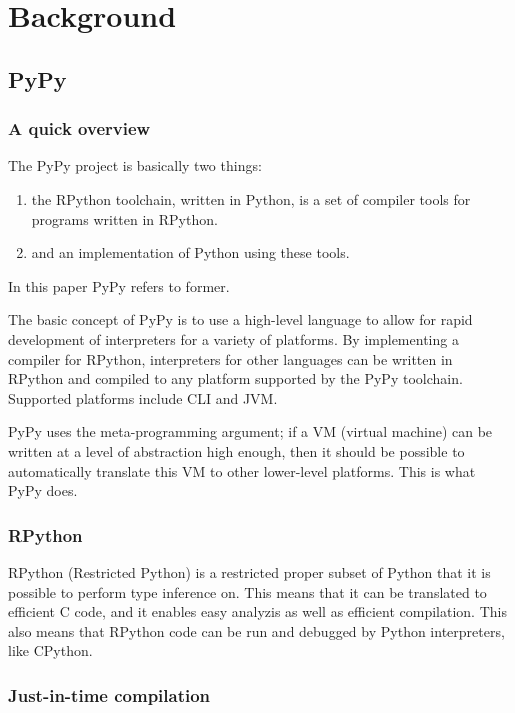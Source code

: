 
\section{Background}

\subsection{PyPy}

\subsubsection{A quick overview}

The PyPy project is basically two things:

\begin{enumerate}
\item the RPython toolchain, written in Python, is a set of compiler tools for 
programs written in RPython.
\item and an implementation of Python using these tools.
\end{enumerate}

In this paper PyPy refers to former.

The basic concept of PyPy is to use a high-level language to allow for rapid
development of interpreters for a variety of platforms. By implementing a compiler
for RPython, interpreters for other languages can be written in RPython and 
compiled to any platform supported by the PyPy toolchain. Supported platforms include
CLI and JVM. \cite{ancona2007rpython}

PyPy uses the meta-programming argument; if a VM (virtual machine) can be written
at a level of abstraction high enough, then it should be possible to automatically translate 
this VM to other lower-level platforms. This is what PyPy does. \cite{pypy}

\subsubsection{RPython}

RPython (Restricted Python) is a restricted proper subset of Python that it 
is possible to perform type inference on. This means that it can be 
translated to efficient C code, and it enables easy analyzis 
as well as efficient compilation. This also means that RPython code can be
run and debugged by Python interpreters, like CPython. \cite{ancona2007rpython}

\subsubsection{Just-in-time compilation}

